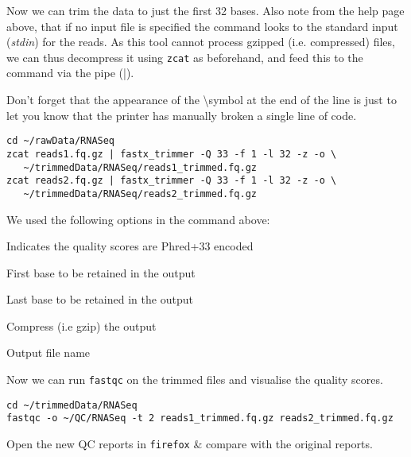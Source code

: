 \begin{steps}
Now we can trim the data to just the first 32 bases.
Also note from the help page above, that if no input file is specified the command looks to the standard input (\textit{stdin}) for the reads.
As this tool cannot process gzipped (i.e. compressed) files, we can thus decompress it using \texttt{zcat} as beforehand, and feed this to the command via the pipe (|).
\end{steps}
\begin{warning}
Don't forget that the appearance of the \textbackslash  symbol at the end of the line is just to let you know that the printer has manually broken a single line of code.
\end{warning}
\begin{lstlisting}
cd ~/rawData/RNASeq
zcat reads1.fq.gz | fastx_trimmer -Q 33 -f 1 -l 32 -z -o \
   ~/trimmedData/RNASeq/reads1_trimmed.fq.gz
zcat reads2.fq.gz | fastx_trimmer -Q 33 -f 1 -l 32 -z -o \
   ~/trimmedData/RNASeq/reads2_trimmed.fq.gz
\end{lstlisting}

\begin{note}
We used the following options in the command above:
\begin{description}[style=multiline,labelindent=0cm,align=right,leftmargin=0.8\descriptionlabelspace,rightmargin=1.5cm,font=\ttfamily]
\item[-Q 33] Indicates the quality scores are Phred+33 encoded
\item[-f 1] First base to be retained in the output
\item[-l 32] Last base to be retained in the output
\item[-z] Compress (i.e gzip) the output
\item[-o] Output file name
\end{description}
\end{note}

\begin{steps}
Now we can run \texttt{fastqc} on the trimmed files and visualise the quality scores.
\begin{lstlisting}
cd ~/trimmedData/RNASeq
fastqc -o ~/QC/RNASeq -t 2 reads1_trimmed.fq.gz reads2_trimmed.fq.gz
\end{lstlisting}
Open the new QC reports in \texttt{firefox} \& compare with the original reports.
\end{steps}


